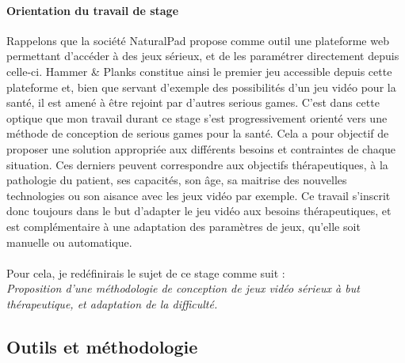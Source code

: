 	\paragraph{Orientation du travail de stage \\}
Rappelons que la société NaturalPad propose comme outil une plateforme web permettant d'accéder à des jeux sérieux, et de les paramétrer directement depuis celle-ci. Hammer \& Planks constitue ainsi le premier jeu accessible depuis cette plateforme et, bien que servant d'exemple des possibilités d'un jeu vidéo pour la santé, il est amené à être rejoint par d'autres serious games. C'est dans cette optique que mon travail durant ce stage s'est progressivement orienté vers une méthode de conception de serious games pour la santé. Cela a pour objectif de proposer une solution appropriée aux différents besoins et contraintes de chaque situation. Ces derniers peuvent correspondre aux objectifs thérapeutiques, à la pathologie du patient, ses capacités, son âge, sa maitrise des nouvelles technologies ou son aisance avec les jeux vidéo par exemple.
Ce travail s'inscrit donc toujours dans le but d'adapter le jeu vidéo aux besoins thérapeutiques, et est complémentaire à une adaptation des paramètres de jeux, qu'elle soit manuelle ou automatique.
 
\paragraph{}Pour cela, je redéfinirais le sujet de ce stage comme suit :\\
\textcolor{marron}{\emph{ {\large Proposition d'une méthodologie de conception de jeux vidéo sérieux à but thérapeutique, et adaptation de la difficulté.}}}

\subsection{Outils et méthodologie}
